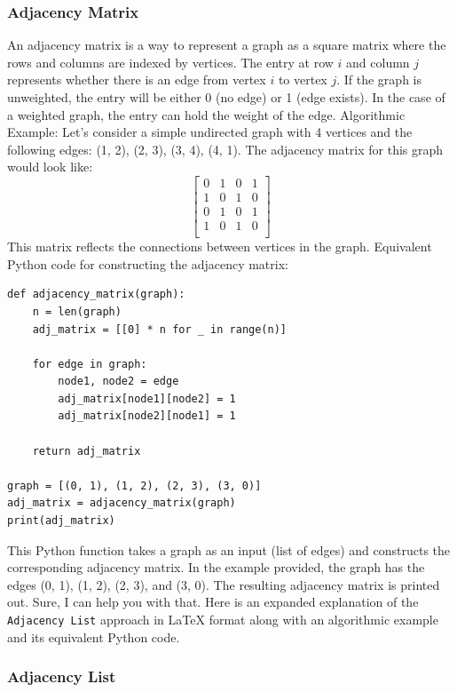 \documentclass[12pt]{book} %
\begin{document}
\subsubsection{Adjacency Matrix}

An adjacency matrix is a way to represent a graph as a square matrix where the rows and columns are indexed by vertices. The entry at row $i$ and column $j$ represents whether there is an edge from vertex $i$ to vertex $j$. If the graph is unweighted, the entry will be either 0 (no edge) or 1 (edge exists). In the case of a weighted graph, the entry can hold the weight of the edge.
\FloatBarrier
Algorithmic Example:
\FloatBarrier
Let's consider a simple undirected graph with 4 vertices and the following edges: (1, 2), (2, 3), (3, 4), (4, 1).
\FloatBarrier
The adjacency matrix for this graph would look like:
\FloatBarrier
\[
\begin{bmatrix}
0 & 1 & 0 & 1 \\
1 & 0 & 1 & 0 \\
0 & 1 & 0 & 1 \\
1 & 0 & 1 & 0 \\
\end{bmatrix}
\]
\FloatBarrier
This matrix reflects the connections between vertices in the graph.
\FloatBarrier
Equivalent Python code for constructing the adjacency matrix:
\FloatBarrier
\begin{lstlisting}
def adjacency_matrix(graph):
    n = len(graph)
    adj_matrix = [[0] * n for _ in range(n)]
    
    for edge in graph:
        node1, node2 = edge
        adj_matrix[node1][node2] = 1
        adj_matrix[node2][node1] = 1
    
    return adj_matrix

graph = [(0, 1), (1, 2), (2, 3), (3, 0)]
adj_matrix = adjacency_matrix(graph)
print(adj_matrix)
\end{lstlisting}
\FloatBarrier
This Python function takes a graph as an input (list of edges) and constructs the corresponding adjacency matrix. In the example provided, the graph has the edges (0, 1), (1, 2), (2, 3), and (3, 0). The resulting adjacency matrix is printed out.
Sure, I can help you with that. Here is an expanded explanation of the \texttt{Adjacency List} approach in LaTeX format along with an algorithmic example and its equivalent Python code.

\subsubsection{Adjacency List}
\end{document}
